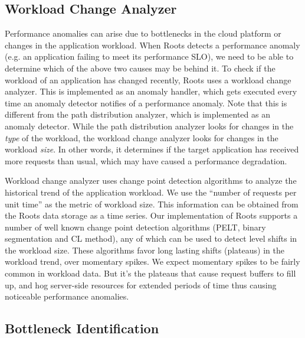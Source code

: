 \subsection{Workload Change Analyzer}
Performance anomalies can arise due to bottlenecks in the cloud platform or changes in the application
workload.
When Roots detects a performance anomaly (e.g. an application failing to meet its performance SLO),
we need to be able to determine which of the above two causes may be behind it.
To check if the workload of an application has changed recently, Roots uses a workload change analyzer.
This is implemented as an anomaly handler, which gets executed every time an anomaly detector
notifies of a performance anomaly. Note that this is different from the path distribution analyzer,
which is implemented as an anomaly detector. While the path distribution analyzer looks for changes in the
\textit{type} of the workload, the workload change analyzer looks for changes in the workload \textit{size}.
In other words, it determines if the target application has received more requests than usual, which
may have caused a performance degradation.

Workload change analyzer uses change point detection algorithms to analyze the historical trend of 
the application workload. We use the ``number of requests
per unit time'' as the metric of workload size. This information can be obtained from the Roots
data storage as a time series. Our implementation of Roots supports a number of well known change point
detection algorithms (PELT, binary segmentation and CL method), any of which can be used to detect level shifts in the
workload size. These algorithms favor long lasting shifts (plateaus) in the workload trend, over momentary spikes.
We expect momentary spikes to be fairly common in workload data. But it's the plateaus that cause
request buffers to fill up, and hog server-side resources for extended periods of time thus
causing noticeable performance anomalies.

\subsection{Bottleneck Identification}